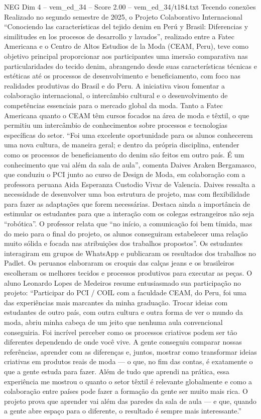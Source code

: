 \begin{textsample}{NEG Dim 4 – vem\_ed\_34 – Score 2.00 – vem\_ed\_34/t184.txt}  \label{ex:f4_neg_104}
Tecendo conexões Realizado no segundo semestre de 2025, o Projeto Colaborativo Internacional “Conociendo las características del tejido denim en Perú y Brasil: Diferencias y similitudes en los procesos de desarrollo y lavados”, realizado entre a Fatec Americana e o Centro de Altos Estudios de la Moda (CEAM, Peru), teve como objetivo principal proporcionar aos participantes uma imersão comparativa nas particularidades do tecido denim, abrangendo desde suas características técnicas e estéticas até os processos de desenvolvimento e beneficiamento, com foco nas realidades produtivas do Brasil e do Peru.
A iniciativa visou fomentar a colaboração internacional, o intercâmbio cultural e o desenvolvimento de competências essenciais para o mercado global da moda.
Tanto a Fatec Americana quanto o CEAM têm cursos focados na área de moda e têxtil, o que permitiu um intercâmbio de conhecimentos sobre processos e tecnologias específicas do setor. “Foi uma excelente oportunidade para os alunos conhecerem uma nova cultura, de maneira geral; e dentro da própria disciplina, entender como os processos de beneficiamento do denim são feitos em outro país.
É um conhecimento que vai além da sala de aula”, comenta Daives Araken Bergamasco, que conduziu o PCI junto ao curso de Design de Moda, em colaboração com a professora peruana Aida Esperanza Custodio Vivar de Valencia.
Daives ressalta a necessidade de desenvolver uma boa estrutura de projeto, mas com flexibilidade para fazer as adaptações que forem necessárias.
Destaca ainda a importância de estimular os estudantes para que a interação com os colegas estrangeiros não seja “robótica”.
O professor relata que “no início, a comunicação foi bem tímida, mas do meio para o final do projeto, os alunos conseguiram estabelecer uma relação muito sólida e focada nas atribuições dos trabalhos propostos”.
Os estudantes interagiram em grupos de WhatsApp e publicaram os resultados dos trabalhos no Padlet.
Os peruanos elaboraram os croquis das calças jeans e os brasileiros escolheram os melhores tecidos e processos produtivos para executar as peças.
O aluno Leonardo Lopes de Medeiros resume entusiasmado sua participação no projeto: “Participar do PCI / COIL com a faculdade CEAM, do Peru, foi uma das experiências mais marcantes da minha graduação.
Trocar ideias com estudantes de outro país, com outra cultura e outra forma de ver o mundo da moda, abriu minha cabeça de um jeito que nenhuma aula convencional conseguiria.
Foi incrível perceber como os processos criativos podem ser tão diferentes dependendo de onde você vive.
A gente conseguiu comparar nossas referências, aprender com as diferenças e, juntos, mostrar como transformar ideias criativas em produtos reais de moda — o que, no fim das contas, é exatamente o que a gente estuda para fazer.
Além de tudo que aprendi na prática, essa experiência me mostrou o quanto o setor têxtil é relevante globalmente e como a colaboração entre países pode fazer a formação da gente ser muito mais rica.
O projeto prova que aprender vai além das paredes da sala de aula — e que, quando a gente abre espaço para o diferente, o resultado é sempre mais interessante.”

\end{textsample}
